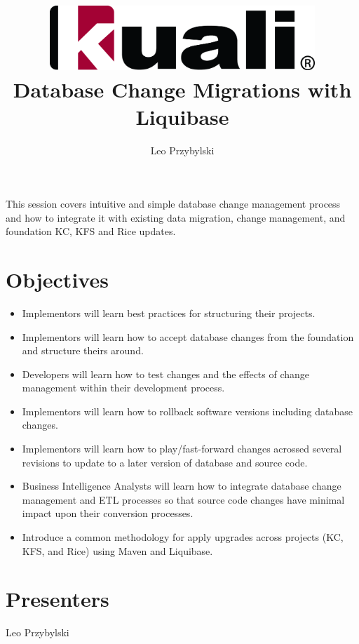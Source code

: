 \documentclass[12pt,notitlepage]{article}
\author{Leo Przybylski}
\title{\includegraphics[width=0.75\textwidth]{kuali_base.png}\\Database Change Migrations with Liquibase}
\date{}
\begin{document}
\maketitle


This session covers intuitive and simple database change management
process and how to integrate it with existing data migration, change
management, and foundation KC, KFS and Rice updates.

\section{Objectives}
\begin{itemize}
\item Implementors will learn best practices for structuring their projects.
\item Implementors will learn how to accept database changes from the foundation and structure theirs around.
\item Developers will learn how to test changes and the effects of change management within their development process.
\item Implementors will learn how to rollback software versions including database changes.
\item Implementors will learn how to play/fast-forward changes acrossed several revisions to update to a later version of database and source code.
\item Business Intelligence Analysts will learn how to integrate database change management and ETL processes so that source code changes have minimal impact upon their conversion processes.
\item Introduce a common methodology for apply upgrades across projects (KC,
KFS, and Rice) using Maven and Liquibase.
\end{itemize}

\section{Presenters}
Leo Przybylski
\end{document}
